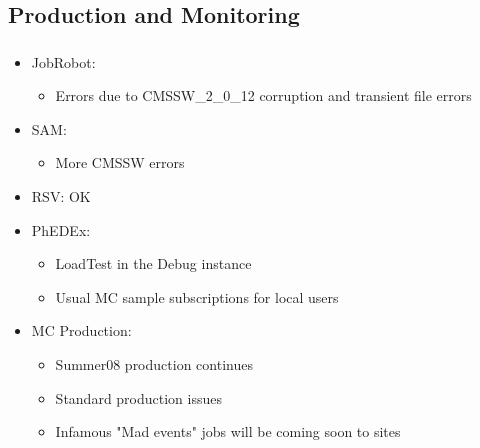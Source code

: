 \documentclass{beamer}
\begin{document}
\subsection{Production and Monitoring}
\begin{frame}
\frametitle{}
\begin{itemize}
     \item JobRobot:
     \begin{itemize}
        \item Errors due to CMSSW\_2\_0\_12 corruption and transient file errors
     \end{itemize}
     \item SAM:
     \begin{itemize}
        \item More CMSSW errors
     \end{itemize}
     \item RSV: OK
     \item PhEDEx:
     \begin{itemize}
        \item LoadTest in the Debug instance 
        \item Usual MC sample subscriptions for local users
     \end{itemize}
     \item MC Production:
     \begin{itemize}
        \item Summer08 production continues
        \item Standard production issues
        \item Infamous "Mad events" jobs will be coming soon to sites
     \end{itemize}
\end{itemize}
\end{frame}
\end{document}
